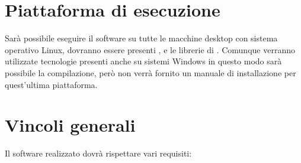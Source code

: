 \documentclass[../AnalisideiRequisiti.tex]{subfiles}
\begin{document}
\section{Piattaforma di esecuzione}
Sarà possibile eseguire il software su tutte le macchine desktop con sistema operativo Linux, dovranno essere presenti ,  e le librerie di . Comunque verranno utilizzate tecnologie presenti anche su sistemi Windows in questo modo sarà possibile la compilazione, però non verrà fornito un manuale di installazione per quest’ultima piattaforma.

\section{Vincoli generali}
Il software realizzato dovrà rispettare vari requisiti:
\end{document}
